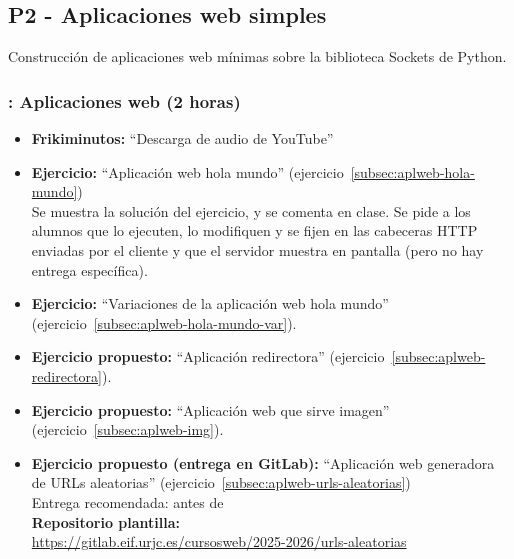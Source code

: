 \documentclass[a4paper,12pt]{article}
\begin{document}
\subsection{P2 - Aplicaciones web simples}


Construcción de aplicaciones web mínimas sobre la biblioteca Sockets de Python.


\subsubsection{\juevesD: Aplicaciones web (2 horas)}
\label{cal:juevesD}

\begin{itemize}
\item \textbf{Frikiminutos:} ``Descarga de audio de YouTube''
\item \textbf{Ejercicio:} ``Aplicación web hola mundo'' (ejercicio~\ref{subsec:aplweb-hola-mundo}) \\
   Se muestra la solución del ejercicio, y se comenta en clase. Se pide a los alumnos que lo ejecuten, lo modifiquen y se fijen en las cabeceras HTTP enviadas por el cliente y que el servidor muestra en pantalla (pero no hay entrega específica).
 \item \textbf{Ejercicio:} ``Variaciones de la aplicación web hola mundo'' (ejercicio~\ref{subsec:aplweb-hola-mundo-var}).
 \item \textbf{Ejercicio propuesto:} ``Aplicación redirectora'' (ejercicio~\ref{subsec:aplweb-redirectora}).
 \item \textbf{Ejercicio propuesto:} ``Aplicación web que sirve imagen'' (ejercicio~\ref{subsec:aplweb-img}).

\item \textbf{Ejercicio propuesto (entrega en GitLab):} ``Aplicación web generadora de URLs aleatorias'' (ejercicio~\ref{subsec:aplweb-urls-aleatorias}) \\
   Entrega recomendada: antes de \juevesE \\
   \textbf{Repositorio plantilla:} \\
   \url{https://gitlab.eif.urjc.es/cursosweb/2025-2026/urls-aleatorias}
\end{itemize}


\end{document}
